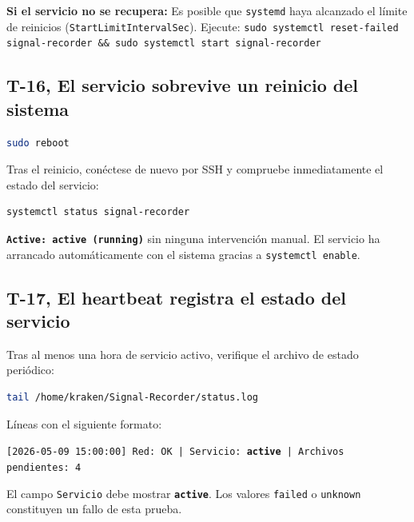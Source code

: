 \begin{important}
    \textbf{Si el servicio no se recupera:} Es posible que \texttt{systemd} haya alcanzado el límite de reinicios (\texttt{StartLimitIntervalSec}). Ejecute: \texttt{sudo systemctl reset-failed signal-recorder \&\& sudo systemctl start signal-recorder}
\end{important}

\subsection{T-16, El servicio sobrevive un reinicio del sistema}

\begin{lstlisting}[language=bash]
sudo reboot
\end{lstlisting}

Tras el reinicio, conéctese de nuevo por SSH y compruebe inmediatamente el estado del servicio:

\begin{lstlisting}[language=bash]
systemctl status signal-recorder
\end{lstlisting}

\begin{tcolorbox}[colback=gray!5, colframe=deyposcolor, title=Resultado esperado (T-16)]
\texttt{\textbf{Active: active (running)}} sin ninguna intervención manual. El servicio ha arrancado automáticamente con el sistema gracias a \texttt{systemctl enable}.
\end{tcolorbox}

\subsection{T-17, El heartbeat registra el estado del servicio}

Tras al menos una hora de servicio activo, verifique el archivo de estado periódico:

\begin{lstlisting}[language=bash]
tail /home/kraken/Signal-Recorder/status.log
\end{lstlisting}

\begin{tcolorbox}[colback=gray!5, colframe=deyposcolor, title=Resultado esperado (T-17)]
Líneas con el siguiente formato:
\vspace{0.2cm}
\begin{center}
    \texttt{[2026-05-09 15:00:00] Red: OK | Servicio: \textbf{active} | Archivos pendientes: 4}
\end{center}
\vspace{0.2cm}
El campo \texttt{Servicio} debe mostrar \texttt{\textbf{active}}. Los valores \texttt{failed} o \texttt{unknown} constituyen un fallo de esta prueba.
\end{tcolorbox}

